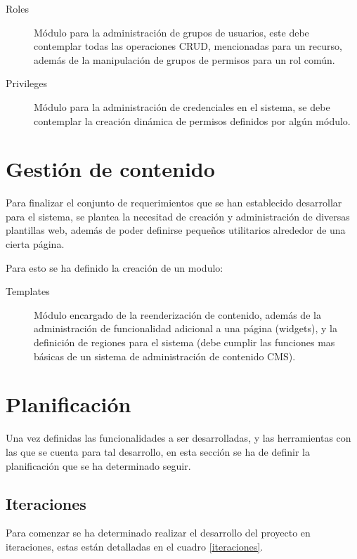\begin{description}
\item [Roles] Módulo para la administración de grupos de usuarios, este debe
contemplar todas las operaciones CRUD, mencionadas para un recurso, además de la
manipulación de grupos de permisos para un rol común.
\item [Privileges] Módulo para la administración de credenciales en el sistema,
se debe contemplar la creación dinámica de permisos definidos por algún módulo.
\end{description}


\section{Gestión de contenido}

Para finalizar el conjunto de requerimientos que se han establecido desarrollar
para el sistema, se plantea la necesitad de creación y administración de
diversas plantillas web, además de poder definirse pequeños utilitarios
alrededor de una cierta página.

Para esto se ha definido la creación de un modulo:

\begin{description}
\item [Templates] Módulo encargado de la reenderización de contenido, además de
la administración de funcionalidad adicional a una página (widgets), y la
definición de regiones para el sistema (debe cumplir las funciones mas básicas
de un sistema de administración de contenido CMS).
\end{description}

\section{Planificación}

Una vez definidas las funcionalidades a ser desarrolladas, y las herramientas
con las que se cuenta para tal desarrollo, en esta sección se ha de definir la
planificación que se ha determinado seguir.

\subsection{Iteraciones}

Para comenzar se ha determinado realizar el desarrollo del proyecto en
iteraciones, estas están detalladas en el cuadro \ref{iteraciones}.

